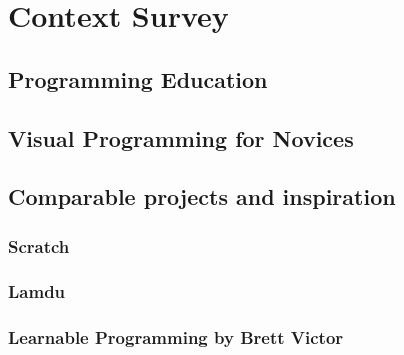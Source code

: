 \chapter{Context Survey}

\section{Programming Education}

\section{Visual Programming for Novices}

\section{Comparable projects and inspiration}

\subsection{Scratch}

\subsection{Lamdu}

\subsection{Learnable Programming by Brett Victor}
